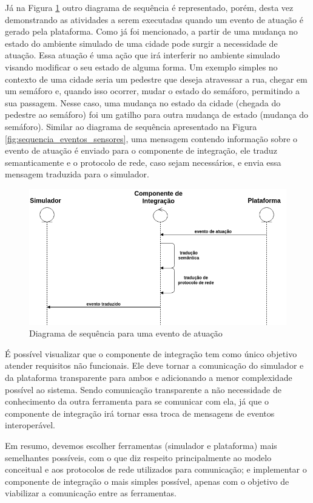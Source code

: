 Já na Figura \ref{fig:sequencia_eventos_atuacao} outro diagrama de sequência é representado, porém, desta vez demonstrando as atividades a serem executadas quando um evento de atuação é gerado pela plataforma.
Como já foi mencionado, a partir de uma mudança no estado do ambiente simulado de uma cidade pode surgir a necessidade de atuação.
Essa atuação é uma ação que irá interferir no ambiente simulado visando modificar o seu estado de alguma forma.
Um exemplo simples no contexto de uma cidade seria um pedestre que deseja atravessar a rua, chegar em um semáforo e, quando isso ocorrer, mudar o estado do semáforo, permitindo a sua passagem.
Nesse caso, uma mudança no estado da cidade (chegada do pedestre ao semáforo) foi um gatilho para outra mudança de estado (mudança do semáforo). 
Similar ao diagrama de sequência apresentado na Figura \ref{fig:sequencia_eventos_sensores}, uma mensagem contendo informação sobre o evento de atuação é enviado para o componente de integração,
ele traduz semanticamente e o protocolo de rede, caso sejam necessários, e envia essa mensagem traduzida para o simulador.

\begin{figure}[ht]
	\centering
	\includegraphics[width=\textwidth]{figuras/sequencia_eventos_atuacao.png}
	\caption{Diagrama de sequência para uma evento de atuação}
	\label{fig:sequencia_eventos_atuacao}
\end{figure}

É possível visualizar que o componente de integração tem como único objetivo atender requisitos não funcionais.
Ele deve tornar a comunicação do simulador e da plataforma transparente para ambos e adicionando a menor complexidade possível ao sistema.
Sendo comunicação transparente a não necessidade de conhecimento da outra ferramenta para se comunicar com ela, já que o componente de integração irá tornar essa troca de mensagens de eventos interoperável.

Em resumo, devemos escolher ferramentas (simulador e plataforma) mais semelhantes possíveis, com o que diz respeito principalmente ao modelo conceitual e aos protocolos de
rede utilizados para comunicação; e implementar o componente de integração o mais simples possível, apenas com o objetivo de viabilizar a comunicação entre as ferramentas.

